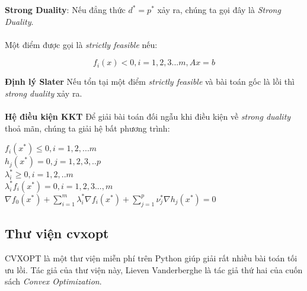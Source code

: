 \documentclass[a4paper, 12pt, oneside]{report}
\begin{document}
\textbf{Strong Duality}: Nếu đẳng thức $d^* = p^*$ xảy ra, chúng ta gọi đây là \textit{Strong Duality}.\\ \\
Một điểm được gọi là \textit{strictly feasible} nếu:
 \begin{mybox}
 $$ f_i(x)<0, i=1,2,3...m, Ax = b$$
 \end{mybox}
 \textbf{Định lý Slater} Nếu tổn tại một điểm \textit{strictly feasible} và bài toán gốc là lồi thì \textit{strong duality} xảy ra.\\ \\
 \textbf{Hệ điều kiện KKT} Để giải bài toán đối ngẫu khi điều kiện về \textit{strong duality} thoả mãn, chúng ta giải hệ bất phương trình: 
\begin{mybox}
    $f_i(x^*) \leq 0, i = 1,2,...m$\\
    $h_j(x^*) = 0, j = 1,2,3,..p$\\
    $\lambda_i^* \geq 0, i = 1,2,..m$\\
    $\lambda_i^*f_i(x^*) = 0, i = 1,2,3...,m$\\
    $\nabla f_0(x^*) + \sum_{i=1}^{m}{\lambda_i^* \nabla f_i(x^*)} + \sum_{j=1}^{p}{\nu_j^* \nabla h_j(x^*)} = 0$
\end{mybox}
\subsection{Thư viện cvxopt}
CVXOPT là một thư viện miễn phí trên Python giúp giải rất nhiều bài toán tối ưu lồi. Tác giả của thư viện này, Lieven Vanderberghe là tác giả thứ hai của cuốn sách \textit{Convex Optimization}.
\end{document}
